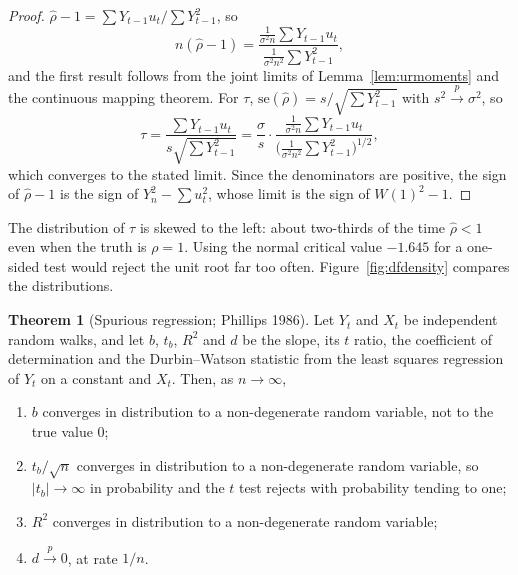 \documentclass[11pt,a4paper]{article}
\numberwithin{equation}{section}
\theoremstyle{definition}
\newtheorem{thm}{Theorem}[subsection]
\begin{document}
\begin{proof}
$\hat\rho - 1 = \sum Y_{t-1}u_t/\sum Y_{t-1}^2$, so
\[
n(\hat\rho - 1) = \frac{\frac{1}{\sigma^2n}\sum Y_{t-1}u_t}{\frac{1}{\sigma^2n^2}\sum Y_{t-1}^2},
\]
and the first result follows from the joint limits of Lemma~\ref{lem:urmoments} and the continuous mapping theorem. For $\tau$, $\text{se}(\hat\rho) = s/\sqrt{\sum Y_{t-1}^2}$ with
$s^2 \xrightarrow{p} \sigma^2$, so
\[
\tau = \frac{\sum Y_{t-1}u_t}{s\sqrt{\sum Y_{t-1}^2}} = \frac{\sigma}{s}\cdot\frac{\frac{1}{\sigma^2n}\sum Y_{t-1}u_t}{\bigl(\frac{1}{\sigma^2n^2}\sum Y_{t-1}^2\bigr)^{1/2}} ,
\]
which converges to the stated limit. Since the denominators are positive, the sign of $\hat\rho - 1$ is the sign of $Y_n^2 - \sum u_t^2$, whose limit is the sign of $W(1)^2 - 1$.
\end{proof}

The distribution of $\tau$ is skewed to the left: about two-thirds of the time $\hat\rho < 1$ even when the truth is $\rho = 1$. Using the normal critical value
$-1.645$ for a one-sided test would reject the unit root far too often. Figure~\ref{fig:dfdensity} compares the distributions.

\begin{thm}[Spurious regression; Phillips 1986]
\label{thm:spurious}
Let $Y_t$ and $X_t$ be independent random walks, and let $b$, $t_b$, $R^2$ and $d$ be the slope, its $t$ ratio, the coefficient of determination and the
Durbin--Watson statistic from the least squares regression of $Y_t$ on a constant and $X_t$. Then, as $n \to \infty$,
\begin{enumerate}[label=(\roman*)]
\item $b$ converges in distribution to a non-degenerate random variable, not to the true value $0$;
\item $t_b/\sqrt n$ converges in distribution to a non-degenerate random variable, so $|t_b| \to \infty$ in probability and the $t$ test rejects with probability
tending to one;
\item $R^2$ converges in distribution to a non-degenerate random variable;
\item $d \xrightarrow{p} 0$, at rate $1/n$.
\end{enumerate}
\end{thm}
\end{document}
